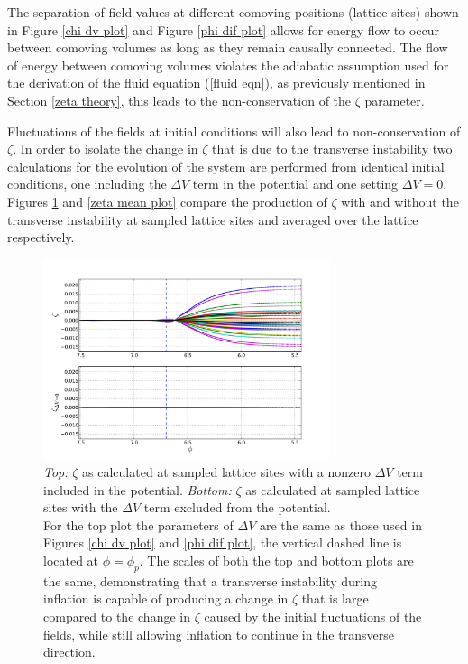 \documentclass[letterpaper,11pt]{article}
\begin{document}

The separation of field values at different comoving positions (lattice sites) shown in Figure \ref{chi dv plot} and Figure \ref{phi dif plot} allows for energy flow to occur between comoving volumes as long as they remain causally connected. The flow of energy between comoving volumes violates the adiabatic assumption used for the derivation of the fluid equation (\ref{fluid eqn}), as previously mentioned in Section \ref{zeta theory}, this leads to the non-conservation of the $\zeta$ parameter. 

Fluctuations of the fields at initial conditions will also lead to non-conservation of $\zeta$. In order to isolate the change in $\zeta$ that is due to the transverse instability two calculations for the evolution of the system are performed from identical initial conditions, one including the $\Delta V$ term in the potential and one setting $\Delta V=0$. Figures \ref{zeta sample plot} and \ref{zeta mean plot} compare the production of $\zeta$ with and without the transverse instability at sampled lattice sites and averaged over the lattice respectively.

\begin{figure}
\begin{center}
\includegraphics[width=0.75\textwidth]{zeta_sample_plot1.png}
\caption{\emph{Top:} $\zeta$ as calculated at sampled lattice sites with a nonzero $\Delta V$ term included in the potential. \emph{Bottom:} $\zeta$ as calculated at sampled lattice sites with the $\Delta V$ term excluded from the potential.\\
For the top plot the parameters of $\Delta V$ are the same as those used in Figures \ref{chi dv plot} and \ref{phi dif plot}, the vertical dashed line is located at $\phi=\phi_p$. The scales of both the top and bottom plots are the same, demonstrating that a transverse instability during inflation is capable of producing a change in $\zeta$ that is large compared to the change in $\zeta$ caused by the initial fluctuations of the fields, while still allowing inflation to continue in the transverse direction.}
\label{zeta sample plot}
\end{center}
\end{figure}
\end{document}
